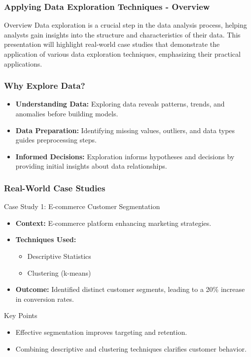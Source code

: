 \documentclass[aspectratio=169]{beamer}
\begin{document}
\begin{frame}[fragile]
    \frametitle{Applying Data Exploration Techniques - Overview}
    \begin{block}{Overview}
    Data exploration is a crucial step in the data analysis process, helping analysts gain insights into the structure and characteristics of their data. This presentation will highlight real-world case studies that demonstrate the application of various data exploration techniques, emphasizing their practical applications.
    \end{block}
\end{frame}

\begin{frame}[fragile]
    \frametitle{Why Explore Data?}
    \begin{itemize}
        \item \textbf{Understanding Data:} 
            Exploring data reveals patterns, trends, and anomalies before building models.
        \item \textbf{Data Preparation:} 
            Identifying missing values, outliers, and data types guides preprocessing steps.
        \item \textbf{Informed Decisions:} 
            Exploration informs hypotheses and decisions by providing initial insights about data relationships.
    \end{itemize}
\end{frame}

\begin{frame}[fragile]
    \frametitle{Real-World Case Studies}
    \begin{block}{Case Study 1: E-commerce Customer Segmentation}
        \begin{itemize}
            \item \textbf{Context:} E-commerce platform enhancing marketing strategies.
            \item \textbf{Techniques Used:}
                \begin{itemize}
                    \item Descriptive Statistics
                    \item Clustering (k-means)
                \end{itemize}
            \item \textbf{Outcome:} Identified distinct customer segments, leading to a 20\% increase in conversion rates.
        \end{itemize}
    \end{block}
    
    \begin{block}{Key Points}
        \begin{itemize}
            \item Effective segmentation improves targeting and retention.
            \item Combining descriptive and clustering techniques clarifies customer behavior.
        \end{itemize}
    \end{block}
\end{frame}
\end{document}
